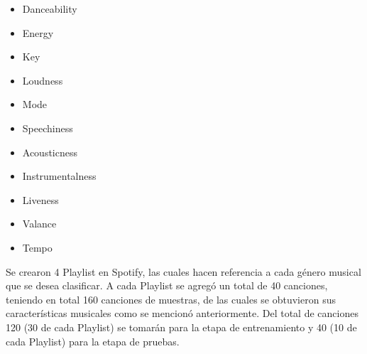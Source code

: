 \documentclass[conference]{IEEEtran}
\begin{document}
\begin{itemize}
	\item Danceability
	\item Energy
	\item Key
	\item Loudness
	\item Mode
	\item Speechiness
	\item Acousticness
	\item Instrumentalness
	\item Liveness
	\item Valance
	\item Tempo \\
\end{itemize}

Se crearon 4 Playlist en Spotify, las cuales hacen referencia a cada género musical que se desea clasificar. A cada Playlist se agregó un total de 40 canciones, teniendo en total 160 canciones de muestras, de las cuales se obtuvieron sus características musicales como se mencionó anteriormente. Del total de canciones 120 (30 de cada Playlist) se tomarán para la etapa de entrenamiento y 40 (10 de cada Playlist) para la etapa de pruebas.\\
\end{document}
